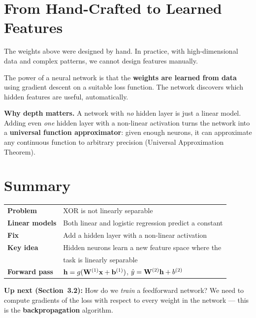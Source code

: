 \documentclass[12pt, a4paper]{article}
\begin{document}
\section{From Hand-Crafted to Learned Features}

The weights above were designed by hand.  In practice, with high-dimensional
data and complex patterns, we cannot design features manually.

The power of a neural network is that the \textbf{weights are learned from
  data} using gradient descent on a suitable loss function.  The network
discovers which hidden features are useful, automatically.

\begin{notebox}
  \textbf{Why depth matters.}
  A network with \emph{no} hidden layer is just a linear model.  Adding even
  \emph{one} hidden layer with a non-linear activation turns the network into a
  \textbf{universal function approximator}: given enough neurons, it can
  approximate any continuous function to arbitrary precision (Universal
  Approximation Theorem).
\end{notebox}

\section{Summary}

\begin{center}
  \renewcommand{\arraystretch}{1.5}
  \begin{tabular}{ll}
    \toprule
    \textbf{Problem}       & XOR is not linearly separable                          \\
    \textbf{Linear models} & Both linear and logistic regression predict a constant \\
    \textbf{Fix}           & Add a hidden layer with a non-linear activation        \\
    \textbf{Key idea}      & Hidden neurons learn a new feature space where the     \\
                           & task is linearly separable                             \\
    \textbf{Forward pass}  & $\mathbf{h} = g(\mathbf{W}^{(1)}\mathbf{x} + \mathbf{b}^{(1)})$,\;
    $\hat{y} = \mathbf{W}^{(2)}\mathbf{h} + b^{(2)}$                                                \\
    \bottomrule
  \end{tabular}
\end{center}

\bigskip
\textbf{Up next (Section~3.2):} How do we \emph{train} a feedforward network?
We need to compute gradients of the loss with respect to every weight in the
network — this is the \textbf{backpropagation} algorithm.
\end{document}
